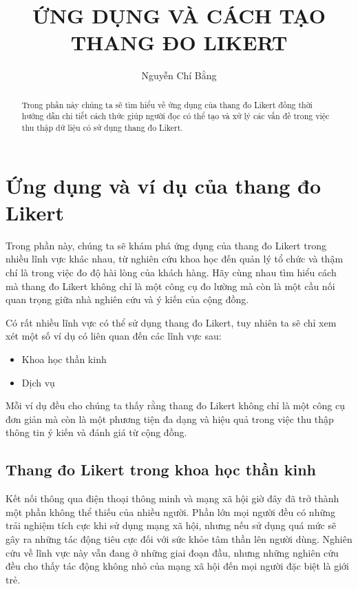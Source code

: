 \documentclass[12pt]{article}
\begin{document}
\setlength{\parindent}{10pt}
\title{ỨNG DỤNG VÀ CÁCH TẠO \\ THANG ĐO LIKERT}
\author{Nguyễn Chí Bằng}
\maketitle
\begin{abstract}
Trong phần này chúng ta sẽ tìm hiểu về ứng dụng của thang đo Likert đồng thời hướng dẫn chi tiết cách thức giúp người đọc có thể tạo và xử lý các vấn đề trong việc thu thập dữ liệu có sử dụng thang đo Likert. 
\end{abstract}

\tableofcontents

\section{Ứng dụng và ví dụ của thang đo Likert}
\phantom{}

Trong phần này, chúng ta sẽ khám phá ứng dụng của thang đo Likert trong nhiều lĩnh vực khác nhau, từ nghiên cứu khoa học đến quản lý tổ chức và thậm chí là trong việc đo độ hài lòng của khách hàng. Hãy cùng nhau tìm hiểu cách mà thang đo Likert không chỉ là một công cụ đo lường mà còn là một cầu nối quan trọng giữa nhà nghiên cứu và ý kiến của cộng đồng.

Có rất nhiều lĩnh vực có thể sử dụng thang đo Likert, tuy nhiên ta sẽ chỉ xem xét một số ví dụ có liên quan đến các lĩnh vực sau:
\begin{itemize}
    \item Khoa học thần kinh
    \item Dịch vụ
\end{itemize}

Mỗi ví dụ đều cho chúng ta thấy rằng thang đo Likert không chỉ là một công cụ đơn giản mà còn là một phương tiện đa dạng và hiệu quả trong việc thu thập thông tin ý kiến và đánh giá từ cộng đồng.

\subsection{Thang đo Likert trong khoa học thần kinh}
\phantom{}

Kết nối thông qua điện thoại thông minh và mạng xã hội giờ đây đã trở thành một phần không thể thiếu của nhiều người. Phần lớn mọi người đều có những trải nghiệm tích cực khi sử dụng mạng xã hội, nhưng nếu sử dụng quá mức sẽ gây ra những tác động tiêu cực đối với sức khỏe tâm thần lên người dùng. Nghiên cứu về lĩnh vực này vẫn đang ở những giai đoạn đầu, nhưng những nghiên cứu đều cho thấy tác động không nhỏ của mạng xã hội đến mọi người đặc biệt là giới trẻ.
\end{document}
